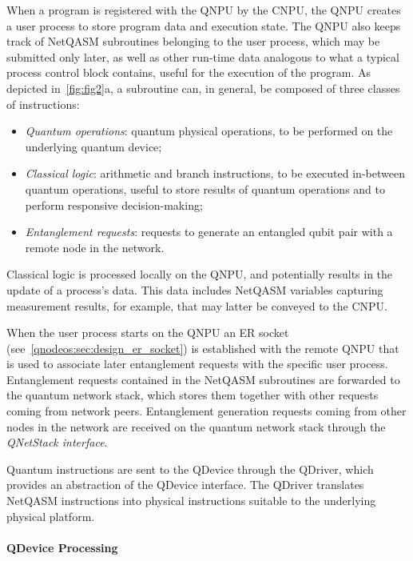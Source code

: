 When a program is registered with the \ac{QNPU} by the \ac{CNPU}, the \ac{QNPU} creates a user process to store program data and execution state. The \ac{QNPU} also keeps track of \ac{NetQASM} subroutines belonging to the user process, which may be submitted only later, as well as other run-time data analogous to what a typical process control block contains, useful for the execution of the program. As depicted in~\cref{fig:fig2}a, a subroutine can, in general, be composed of three classes of instructions:

\begin{itemize}
\item \emph{Quantum operations}: quantum physical operations, to be performed on the underlying quantum device;
\item \emph{Classical logic}: arithmetic and branch instructions, to be executed in-between quantum operations, useful to store results of quantum operations and to perform responsive decision-making;
\item \emph{Entanglement requests}: requests to generate an entangled qubit pair with a remote node in the network.
\end{itemize}
%
Classical logic is processed locally on the \ac{QNPU}, and potentially results in the update of a process's data. This data includes \ac{NetQASM} variables capturing measurement results, for example, that may latter be conveyed to the \ac{CNPU}. 

When the user process starts on the \ac{QNPU} an \ac{ER} socket (see~\cref{qnodeos:sec:design_er_socket}) is established with the remote \ac{QNPU} that is used to associate later entanglement requests with the specific user process. Entanglement requests contained in the \ac{NetQASM} subroutines are forwarded to the quantum network stack,  which stores them together with other requests coming from network peers. Entanglement generation requests coming from other nodes in the network are received on the quantum network stack through the \emph{\ac{QNetStack} interface}.

Quantum instructions are sent to the \ac{QDevice} through the \ac{QDriver}, which provides an abstraction of the \ac{QDevice} interface. The \ac{QDriver} translates \ac{NetQASM} instructions into physical instructions suitable to the underlying physical platform.

\paragraph{QDevice Processing}

